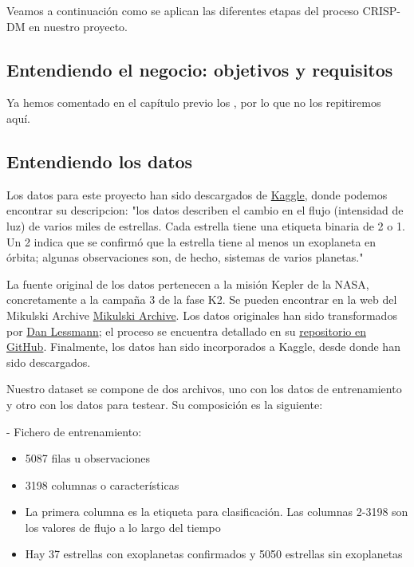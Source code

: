 Veamos a continuación como se aplican las diferentes etapas del proceso CRISP-DM en nuestro proyecto.


\subsection{Entendiendo el negocio: objetivos y requisitos}

Ya hemos comentado en el capítulo previo los , por lo que no los repitiremos aquí.

\subsection{Entendiendo los datos}

Los datos para este proyecto han sido descargados de \href{https://www.kaggle.com/keplersmachines/kepler-labelled-time-series-data}{Kaggle}, donde podemos encontrar su descripcion: "los datos describen el cambio en el flujo (intensidad de luz) de varios miles de estrellas. Cada estrella tiene una etiqueta binaria de 2 o 1. Un 2 indica que se confirmó que la estrella tiene al menos un exoplaneta en órbita; algunas observaciones son, de hecho, sistemas de varios planetas." \cite{Kaggle-exoplanet}

La fuente original de los datos pertenecen a la misión Kepler de la NASA, concretamente a la campaña 3 de la fase K2. Se pueden encontrar en la web del Mikulski Archive \href{https://archive.stsci.edu/k2/}{Mikulski Archive}. Los datos originales han sido transformados por \href{http://www.danlessmann.com/index.htm}{Dan Lessmann}; el proceso se encuentra detallado en su \href{https://github.com/winterdelta/KeplerAI}{repositorio en GitHub}. Finalmente, los datos han sido incorporados a Kaggle, desde donde han sido descargados.

Nuestro dataset se compone de dos archivos, uno con los datos de entrenamiento y otro con los datos para testear. Su composición es la siguiente:

- Fichero de entrenamiento:
\begin{itemize}
	\item 5087 filas u observaciones
	\item 3198 columnas o características
	\item La primera columna es la etiqueta para clasificación. Las columnas 2-3198 son los valores de flujo a lo largo del tiempo
	\item Hay 37 estrellas con exoplanetas confirmados y 5050 estrellas sin exoplanetas
\end{itemize}

